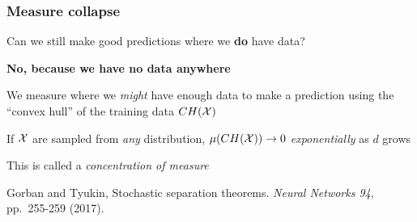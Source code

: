 \documentclass[aspectratio=169]{beamer}
\begin{document}
%
%
%
%
%
%
%
%
%

\begin{frame}
\frametitle{Measure collapse}

Can we still make good predictions where we {\bf do} have data?

\bigskip
\pause

{\bf No, because we have no data anywhere}

\bigskip

We measure where we {\sl might} have enough data to make a prediction
using the ``convex hull'' of the training data $CH({\cal X})$

\bigskip
\pause

If ${\cal X}$ are sampled from {\sl any} distribution,
$\mu(CH({\cal X})) \rightarrow 0$ {\sl exponentially} as $d$ grows

\bigskip

This is called a {\sl concentration of measure}

\vfill

{\tiny Gorban and Tyukin,
Stochastic separation theorems.
{\sl Neural Networks 94}, pp.~255-259 (2017).}

\end{frame}
\end{document}
